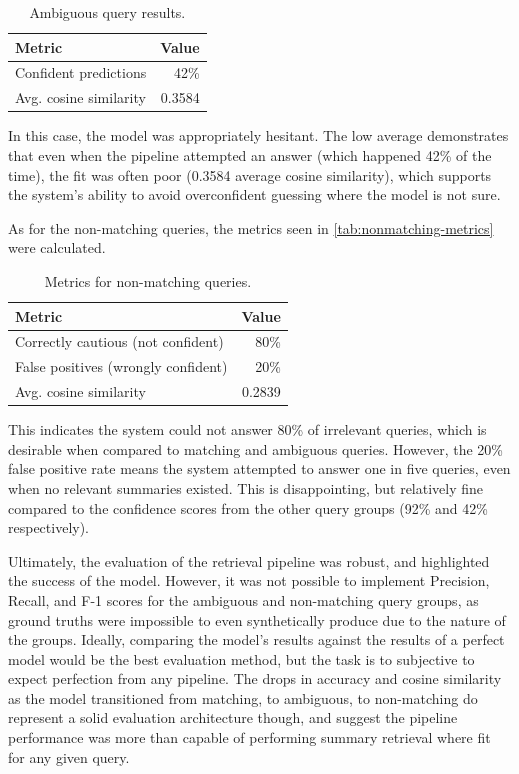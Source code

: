 \documentclass[11pt]{article}
\begin{document}
\begin{table}[t]
  \centering
  \begin{tabular}{l r}
    \textbf{Metric} & \textbf{Value} \\
    \hline
    Confident predictions & 42\% \\
    Avg. cosine similarity & 0.3584 \\
  \end{tabular}
  \caption{Ambiguous query results.}
  \label{tab:ambiguous-query-results}
\end{table}

In this case, the model was appropriately hesitant. The low average demonstrates that even when the pipeline attempted an answer (which happened 42\% of the time), the fit was often poor (0.3584 average cosine similarity), which supports the system's ability to avoid overconfident guessing where the model is not sure. 

As for the non-matching queries, the metrics seen in \autoref{tab:nonmatching-metrics} were calculated.

\begin{table}[t]
  \centering
  \begin{tabular}{l r}
    \textbf{Metric} & \textbf{Value} \\
    \hline
    Correctly cautious (not confident) & 80\% \\
    False positives (wrongly confident) & 20\% \\
    Avg. cosine similarity & 0.2839 \\
  \end{tabular}
  \caption{Metrics for non-matching queries.}
  \label{tab:nonmatching-metrics}
\end{table}

This indicates the system could not answer 80\% of irrelevant queries, which is desirable when compared to matching and ambiguous queries. However, the 20\% false positive rate means the system attempted to answer one in five queries, even when no relevant summaries existed. This is disappointing, but relatively fine compared to the confidence scores from the other query groups (92\% and 42\% respectively).

Ultimately, the evaluation of the retrieval pipeline was robust, and highlighted the success of the model. However, it was not possible to implement Precision, Recall, and F-1 scores for the ambiguous and non-matching query groups, as ground truths were impossible to even synthetically produce due to the nature of the groups. Ideally, comparing the model's results against the results of a perfect model would be the best evaluation method, but the task is to subjective to expect perfection from any pipeline. The drops in accuracy and cosine similarity as the model transitioned from matching, to ambiguous, to non-matching do represent a solid evaluation architecture though, and suggest the pipeline performance was more than capable of performing summary retrieval where fit for any given query.
\end{document}
